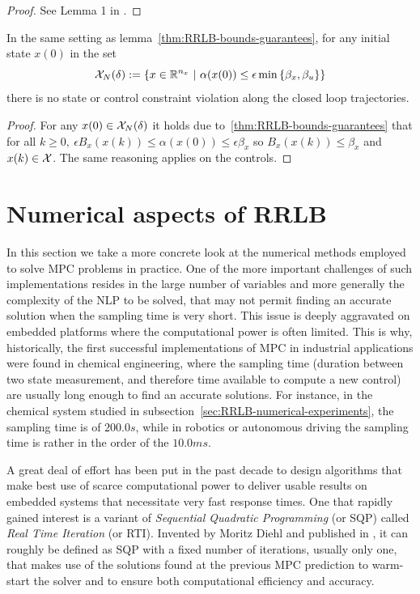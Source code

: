 \documentclass[12pt]{article}
\begin{document}
\begin{proof}
	See Lemma 1 in \cite{RRLB-linear-MPC}.
\end{proof}

\begin{theorem}
	In the same setting as lemma~\ref{thm:RRLB-bounds-guarantees}, for any initial state $x(0)$ in the set
	$$\cal{X}_N(\delta):=\left\{x\in\R^{n_x}~|~\alpha(x(0))\leq\epsilon\min\left\{\beta_x,\beta_u\right\}\right\}$$
	there is no state or control constraint violation along the closed loop trajectories.
\end{theorem}

\begin{proof}
	For any $x(0)\in\cal{X}_N(\delta)$ it holds due to~\ref{thm:RRLB-bounds-guarantees} that for all $k\geq 0,~\epsilon B_x(x(k))\leq\alpha(x(0))\leq\epsilon\beta_x$ so $B_x(x(k))\leq \beta_x$ and $x(k)\in\cal{X}$.
	The same reasoning applies on the controls.
\end{proof}


\section{Numerical aspects of RRLB}\label{sec:RRLB-numerical-aspects}

In this section we take a more concrete look at the numerical methods employed to solve MPC problems in practice.
One of the more important challenges of such implementations resides in the large number of variables and more generally the complexity of the NLP to be solved, that may not permit finding an accurate solution when the sampling time is very short.
This issue is deeply aggravated on embedded platforms where the computational power is often limited.
This is why, historically, the first successful implementations of MPC in industrial applications were found in chemical engineering, where the sampling time (duration between two state measurement, and therefore time available to compute a new control) are usually long enough to find an accurate solutions.
For instance, in the chemical system studied in subsection~\ref{sec:RRLB-numerical-experiments}, the sampling time is of $200.0s$, while in robotics or autonomous driving the sampling time is rather in the order of the $10.0ms$.

A great deal of effort has been put in the past decade to design algorithms that make best use of scarce computational power to deliver usable results on embedded systems that necessitate very fast response times.
One that rapidly gained interest is a variant of \textit{Sequential Quadratic Programming} (or SQP) called \textit{Real Time Iteration} (or RTI).
Invented by Moritz Diehl and published in \cite{rti-diehl}, it can roughly be defined as SQP with a fixed number of iterations, usually only one, that makes use of the solutions found at the previous MPC prediction to warm-start the solver and to ensure both computational efficiency and accuracy.
\end{document}
